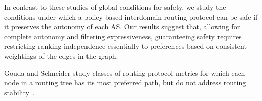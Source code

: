 In contrast to these studies of global conditions for safety, we study
the conditions under which a policy-based interdomain routing protocol
can be safe if it preserves the autonomy of each AS.  Our results
suggest that, allowing for complete autonomy and filtering
expressiveness, guaranteeing safety requires restricting ranking
independence essentially to preferences based on consistent weightings
of the edges in the graph.

Gouda and Schneider study classes of routing protocol metrics for which
each node in a routing tree has its most preferred path, but do not
address routing stability~\cite{Gouda2003}.

